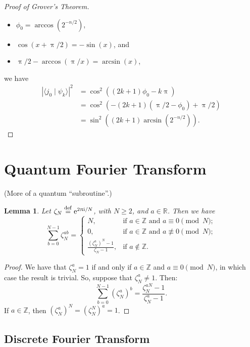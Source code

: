 \documentclass[12pt]{amsart}
\theoremstyle{plain}
\newtheorem{lemma}[theorem]{Lemma}
\theoremstyle{definition}
\theoremstyle{remarks}
\newcommand{\R}{\mathbb{R}}
\newcommand{\Z}{\mathbb{Z}}
\newcommand{\me}{\mathrm{e}}
\newcommand{\mi}{\mathrm{i}}
\newcommand{\mpi}{\uppi}
\newcommand{\idef}{\overset{{\rm def}}{=}}
\newcommand{\abs}[1]{\left| #1 \right|}
\begin{document}
\begin{proof}[Proof of Grover's Theorem]
\begin{itemize}
  \item $\phi_0 = \arccos(2^{-n/2})$,

  \item $\cos(x + \mpi/2) = -\sin(x)$, and

  \item $\mpi/2 - \arccos(\mpi/x) = \arcsin(x)$,

  \end{itemize}
  we have
  \begin{align*}
    \abs{\langle j_0 \mid \psi_k \rangle}^2
    &= \cos^2((2k+1)\phi_0 - k\mpi) \\
    &=\cos^2(-(2k+1)(\mpi/2 - \phi_0) + \mpi/2) \\
    &= \sin^2((2k+1) \arcsin(2^{-n/2})).
  \end{align*}


\end{proof}


\section{Quantum Fourier Transform}


(More of a quantum ``subroutine''.)


\begin{lemma}\label{lemma:expsum}
  Let $\zeta_N \idef \me^{2 \mpi \mi/N}$, with $N \geq 2$, and $a \in \R$.  Then we have
  \[
    \sum_{b=0}^{N-1} \zeta_N^{ab} =
    \begin{cases}
      N, & \text{if $a \in \Z$ and $a \equiv 0 \pmod{N}$}; \\
      0, & \text{if $a \in \Z$ and $a \not\equiv 0 \pmod{N}$}; \\
      \frac{{\left(\zeta_N^{a}\right)}^N - 1}{\zeta_N - 1}, & \text{if $a \not\in \Z$}.
    \end{cases}
  \]
\end{lemma}

\begin{proof}
  We have that $\zeta_N^a = 1$ if and only if $a \in \Z$ and $a \equiv 0 \pmod{N}$, in which case the result is trivial.  So, suppose that $\zeta_N^a \neq 1$.  Then:
  \[
    \sum_{b=0}^{N-1} {\left(\zeta_N^a\right)}^b = \frac{\zeta_N^{aN} - 1}{\zeta_N^a - 1}.
  \]
  If $a \in \Z$, then ${\left( \zeta_N^a \right)}^N = {\left( \zeta_N^N \right)}^a = 1$.
\end{proof}


\subsection{Discrete Fourier Transform}
\end{document}
